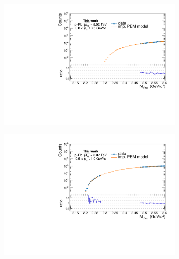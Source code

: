\begin{appendices}
\begin{figure}[!h]
\begin{subfigure}{.5\textwidth}
  \centering
  \captionsetup{justification=centering}
  \includegraphics[width=\linewidth]{gfx/appendix/impem/can_blindPEMimp0}
  \caption{}
\end{subfigure}%
\begin{subfigure}{.5\textwidth}
  \centering
  \captionsetup{justification=centering}
  \includegraphics[width=\linewidth]{gfx/appendix/impem/can_blindPEMimp1}
  \caption{}
\end{subfigure}
\begin{subfigure}{.5\textwidth}
  \centering
  \captionsetup{justification=centering}

\end{subfigure}
\end{figure}
\end{appendices}
